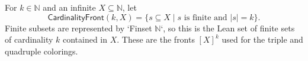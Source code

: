 \begin{definition}
For $k\in\mathbb N$ and an infinite $X\subseteq\mathbb N$, let
\[
\mathsf{CardinalityFront}(k,X)=\{s\subseteq X\mid s\text{ is finite and }|s|=k\}.
\]
Finite subsets are represented by `Finset $\mathbb N$`, so this is the
Lean set of finite sets of cardinality $k$ contained in $X$.  These are
the fronts $[X]^k$ used for the triple and quadruple colorings.
\end{definition}
